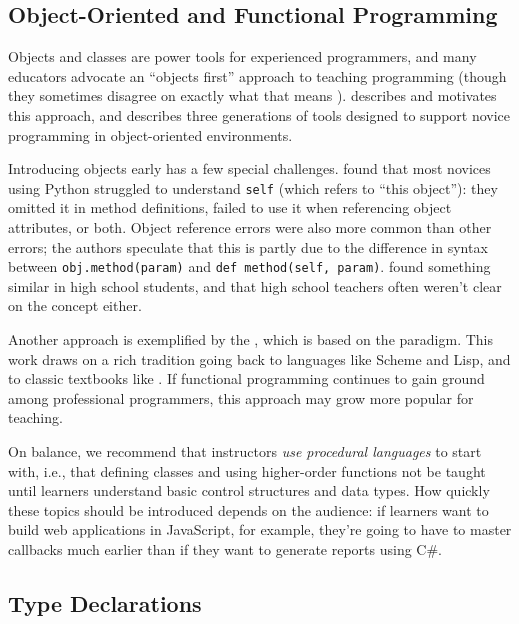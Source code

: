 \subsection*{Object-Oriented and Functional Programming}

Objects and classes are power tools for experienced programmers, and
many educators advocate an ``objects first'' approach to teaching
programming (though they sometimes disagree on exactly what that means
\cite{Benn2007b}). \cite{Sorv2014} describes and motivates this
approach, and \cite{Koll2015} describes three generations of tools
designed to support novice programming in object-oriented environments.

Introducing objects early has a few special challenges.
\cite{Mill2016b} found that most novices using Python struggled to
understand \texttt{self} (which refers to ``this object''): they omitted it in
method definitions, failed to use it when referencing object attributes,
or both. Object reference errors were also more common than other
errors; the authors speculate that this is partly due to the difference
in syntax between \texttt{obj.method(param)} and \texttt{def\ method(self,\ param)}.
\cite{Rago2017} found something similar in high school students, and
that high school teachers often weren't clear on the concept either.

Another approach is exemplified by the ,
which is based on the  paradigm. This work draws on a
rich tradition going back to languages like Scheme and Lisp, and to
classic textbooks like
\cite{Fell2001,Frie1995,Abel1996}. If functional
programming continues to gain ground among professional programmers,
this approach may grow more popular for teaching.

On balance, we recommend that instructors \emph{use procedural languages} to
start with, i.e., that defining classes and using higher-order functions
not be taught until learners understand basic control structures and
data types. How quickly these topics should be introduced depends on the
audience: if learners want to build web applications in JavaScript, for
example, they're going to have to master callbacks much earlier than if
they want to generate reports using C\#.

\subsection*{Type Declarations}

